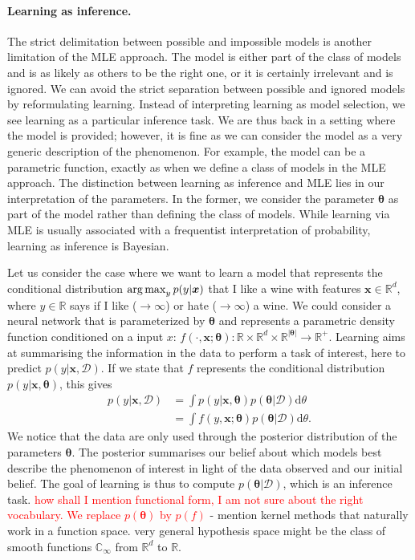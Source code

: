 \paragraph{Learning as inference.}
The strict delimitation between possible and impossible models is another limitation of the MLE approach. The model is either part of the class of models and is as likely as others to be the right one, or it is certainly irrelevant and is ignored. We can avoid the strict separation between possible and ignored models by reformulating learning. Instead of interpreting learning as model selection, we see learning as a particular inference task. We are thus back in a setting where the model is provided; however, it is fine as we can consider the model as a very generic description of the phenomenon. For example, the model can be a parametric function, exactly as when we define a class of models in the MLE approach. The distinction between learning as inference and MLE lies in our interpretation of the parameters. In the former, we consider the parameter $\bm \theta$ as part of the model rather than defining the class of models. While learning via MLE is usually associated with a frequentist interpretation of probability, learning as inference is Bayesian.

Let us consider the case where we want to learn a model that represents the conditional distribution $\operatorname*{arg\,max}_y p(y|\bm x)$ that I like a wine with features $\bm x \in \mathbb{R}^d$, where $y \in \mathbb{R}$ says if I like ($\rightarrow \infty$) or hate ($\rightarrow \infty$) a wine. We could consider a neural network that is parameterized by $\bm \theta$ and represents a parametric density function conditioned on a input $x$: $f(\cdot, \bm x;\bm \theta): \mathbb{R} \times \mathbb{R}^{d} \times \mathbb{R}^{|\bm \theta|} \rightarrow \mathbb{R}^+$.
Learning aims at summarising the information in the data to perform a task of interest, here to predict $p(y|\bm x, \mathcal{D})$.
If we state that $f$ represents the conditional distribution $p(y|\bm x, \bm \theta)$, this gives
\begin{align}
  p(y|\bm x, \mathcal{D}) &= \int p(y|\bm x, \bm \theta) p(\bm \theta | \mathcal{D}) \text{d}\theta\\
  &=\int f(y, \bm x;\bm \theta) p(\bm \theta | \mathcal{D}) \text{d}\theta.
\end{align}
We notice that the data are only used through the posterior distribution of the parameters $\bm \theta$. The posterior summarises our belief about which models best describe the phenomenon of interest in light of the data observed and our initial belief. The goal of learning is thus to compute $p(\bm \theta | \mathcal{D})$, which is an inference task. \textcolor{red}{how shall I mention functional form, I am not sure about the right vocabulary. We replace $p(\bm \theta)$ by $p(f)$} - mention kernel methods that naturally work in a function space.  very general hypothesis space might be the class of smooth functions $\mathbb{C}_\infty$ from $\mathbb{R}^d$ to $\mathbb{R}$.

